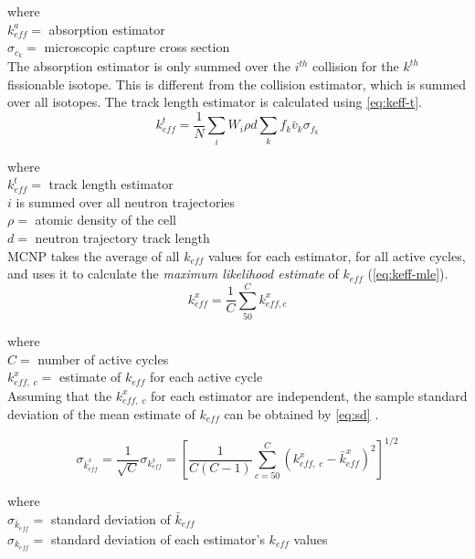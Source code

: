 \noindent where \\
\indent $k_{eff}^{a} = $ absorption estimator \\
\indent $\sigma_{c_{k}} = $ microscopic capture cross section \\

\noindent The absorption estimator is only summed over the $i^{th}$ collision for the $k^{th}$ fissionable isotope.
This is different from the collision estimator, which is summed over all isotopes.
The track length estimator is calculated using \ref{eq:keff-t}.
%
\begin{equation}
  \label{eq:keff-t}
  k_{eff}^{t} = \frac{1}{N} \sum_{i} W_{i} \rho d \sum_{k} f_{k} \bar{v}_{k} \sigma_{f_{k}}
\end{equation}

\noindent where \\
\indent $k_{eff}^{t} = $ track length estimator \\
\indent $i$ is summed over all neutron trajectories \\
\indent $\rho = $ atomic density of the cell \\
\indent $d = $ neutron trajectory track length \\

\noindent MCNP takes the average of all $k_{eff}$ values for each estimator, for all active cycles, and uses it to calculate the \textit{maximum likelihood estimate} of $k_{eff}$ (\ref{eq:keff-mle}).
%
\begin{equation}
  \label{eq:keff-mle}
  k_{eff}^{x} = \frac{1}{C} \sum_{50}^{C} k_{eff,c}^{x}
\end{equation}

\noindent where \\
\indent $C = $ number of active cycles \\
\indent $k_{eff,\;c}^{x} = $ estimate of $k_{eff}$ for each active cycle \\

\noindent Assuming that the $k_{eff,\;c}^{x}$ for each estimator are independent, the sample standard deviation of the mean estimate of $k_{eff}$ can be obtained by \ref{eq:sd} \cite{urbatsch}.

\begin{equation}
  \label{eq:sd}
  \sigma_{\bar{k}_{eff}^{x}} = \frac{1}{\sqrt{C}} \sigma_{k_{eff}^{x}} = \left[ \frac{1}{C(C-1)} \sum_{c = 50}^{C} (k_{eff,\;c}^{x} - \bar{k}_{eff}^{x})^2 \right]^{1/2}
\end{equation}

\noindent where \\
\indent $\sigma_{\bar{k}_{eff}} = $ standard deviation of $\bar{k}_{eff}$ \\
\indent $\sigma_{k_{eff}} = $ standard deviation of each estimator's $k_{eff}$ values \\

